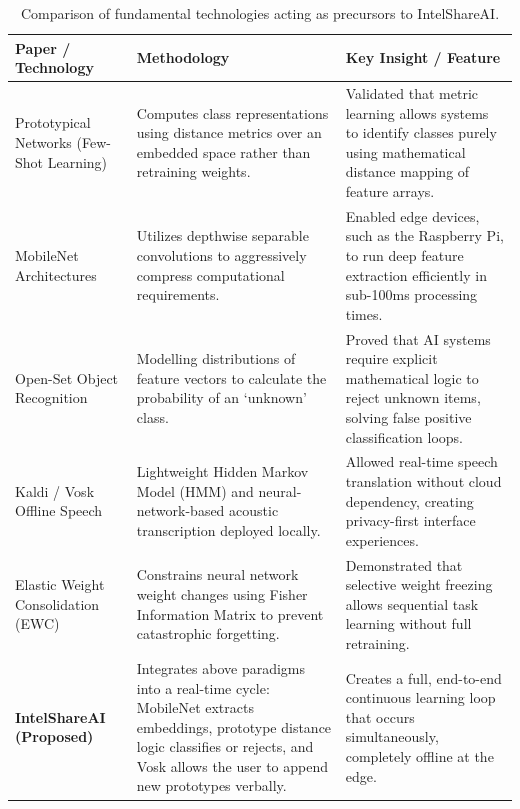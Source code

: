 \documentclass[12pt,a4paper]{report}
\begin{document}
\begin{longtable}{|p{4cm}|p{5cm}|p{5cm}|}
\caption{Comparison of fundamental technologies acting as precursors to IntelShareAI.}\\
\hline
\textbf{Paper / Technology} & \textbf{Methodology} & \textbf{Key Insight / Feature} \\
\hline
\endfirsthead
Prototypical Networks (Few-Shot Learning) \cite{snell2017} & 
Computes class representations using distance metrics over an embedded space rather than retraining weights. & 
Validated that metric learning allows systems to identify classes purely using mathematical distance mapping of feature arrays. \\ \hline

MobileNet Architectures \cite{howard2017} & 
Utilizes depthwise separable convolutions to aggressively compress computational requirements. & 
Enabled edge devices, such as the Raspberry Pi, to run deep feature extraction efficiently in sub-100ms processing times. \\ \hline

Open-Set Object Recognition \cite{bendale2016} & 
Modelling distributions of feature vectors to calculate the probability of an `unknown' class. & 
Proved that AI systems require explicit mathematical logic to reject unknown items, solving false positive classification loops. \\ \hline

Kaldi / Vosk Offline Speech \cite{kaldi}\cite{vosk} & 
Lightweight Hidden Markov Model (HMM) and neural-network-based acoustic transcription deployed locally. & 
Allowed real-time speech translation without cloud dependency, creating privacy-first interface experiences. \\ \hline

Elastic Weight Consolidation (EWC) & 
Constrains neural network weight changes using Fisher Information Matrix to prevent catastrophic forgetting. & 
Demonstrated that selective weight freezing allows sequential task learning without full retraining. \\ \hline

\textbf{IntelShareAI (Proposed)} & 
Integrates above paradigms into a real-time cycle: MobileNet extracts embeddings, prototype distance logic classifies or rejects, and Vosk allows the user to append new prototypes verbally. & 
Creates a full, end-to-end continuous learning loop that occurs simultaneously, completely offline at the edge. \\ \hline

\end{longtable}
\end{document}
